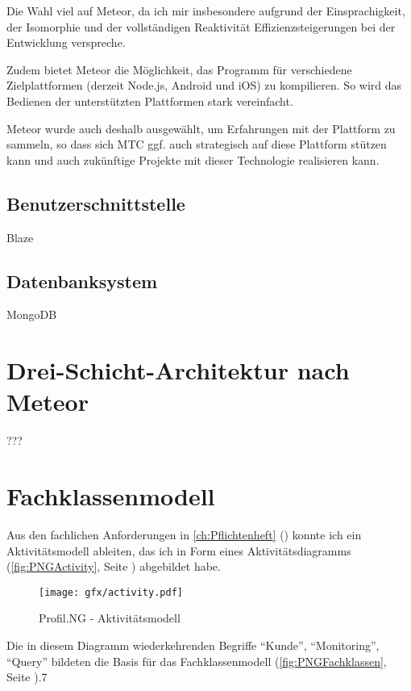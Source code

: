 Die Wahl viel auf Meteor, da ich mir insbesondere aufgrund der Einsprachigkeit,
der Isomorphie und der vollständigen Reaktivität Effizienzsteigerungen bei der
Entwicklung verspreche.

Zudem bietet Meteor die Möglichkeit, das Programm für verschiedene
Zielplattformen (derzeit Node.js, Android und iOS) zu kompilieren. So wird das
Bedienen der unterstützten Plattformen stark vereinfacht.

Meteor wurde auch deshalb ausgewählt, um Erfahrungen mit der Plattform zu
sammeln, so dass sich MTC ggf. auch strategisch auf diese Plattform stützen kann
und auch zukünftige Projekte mit dieser Technologie realisieren kann.

\subsection{Benutzerschnittstelle}

Blaze

\subsection{Datenbanksystem}

MongoDB

\section{Drei-Schicht-Architektur nach Meteor}

???

\section{Fachklassenmodell}

Aus den fachlichen Anforderungen in \autoref{ch:Pflichtenheft}
(\pageref{ch:Pflichtenheft}) konnte ich ein Aktivitätsmodell ableiten, das ich
in Form eines Aktivitätsdiagramms (\autoref{fig:PNGActivity}, Seite
\pageref{fig:PNGActivity}) abgebildet habe.

\begin{figure}[H]
  \texttt{[image: gfx/activity.pdf]}
  \caption{Profil.NG - Aktivitätsmodell}
  \label{fig:PNGActivity}
\end{figure}

Die in diesem Diagramm wiederkehrenden Begriffe "`Kunde"', "`Monitoring"',
"`Query"' bildeten die Basis für das Fachklassenmodell
(\autoref{fig:PNGFachklassen}, Seite \pageref{fig:PNGFachklassen}).7

